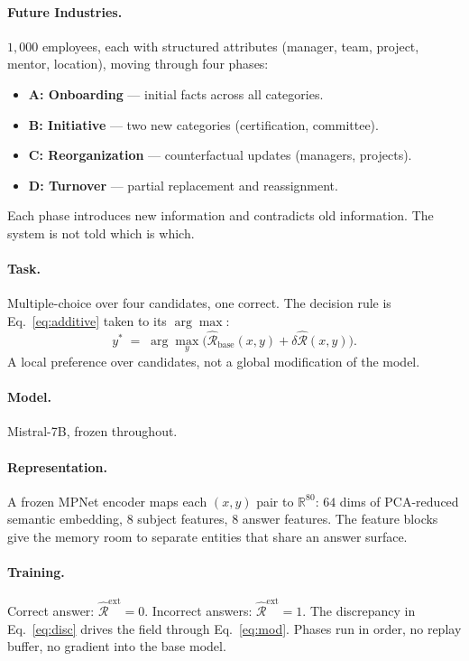 \documentclass[11pt,twocolumn]{article}
\newcommand{\Cohbase}{\widehat{\mathcal{R}}_{\mathrm{base}}}
\newcommand{\Cohext}{\widehat{\mathcal{R}}^{\mathrm{ext}}}
\newcommand{\dCoh}{\delta\widehat{\mathcal{R}}}
\theoremstyle{plain}
\begin{document}
\paragraph{Future Industries.}
$1{,}000$ employees, each with structured attributes (manager, team, project, mentor, location), moving through four phases:
\begin{itemize}[leftmargin=*,itemsep=2pt,topsep=2pt]
\item \textbf{A: Onboarding} --- initial facts across all categories.
\item \textbf{B: Initiative} --- two new categories (certification, committee).
\item \textbf{C: Reorganization} --- counterfactual updates (managers, projects).
\item \textbf{D: Turnover} --- partial replacement and reassignment.
\end{itemize}
Each phase introduces new information and contradicts old information. The system is not told which is which.

\paragraph{Task.}
Multiple-choice over four candidates, one correct. The decision rule is Eq.~\eqref{eq:additive} taken to its $\arg\max$:
\begin{equation}
\label{eq:select}
y^* \;=\; \arg\max_y \Big(\Cohbase(x, y) + \dCoh(x, y)\Big).
\end{equation}
A local preference over candidates, not a global modification of the model.

\paragraph{Model.}
Mistral-7B, frozen throughout.

\paragraph{Representation.}
A frozen MPNet encoder maps each $(x, y)$ pair to $\mathbb{R}^{80}$: $64$ dims of PCA-reduced semantic embedding, $8$ subject features, $8$ answer features. The feature blocks give the memory room to separate entities that share an answer surface.

\paragraph{Training.}
Correct answer: $\Cohext = 0$. Incorrect answers: $\Cohext = 1$. The discrepancy in Eq.~\eqref{eq:disc} drives the field through Eq.~\eqref{eq:mod}. Phases run in order, no replay buffer, no gradient into the base model.
\end{document}
